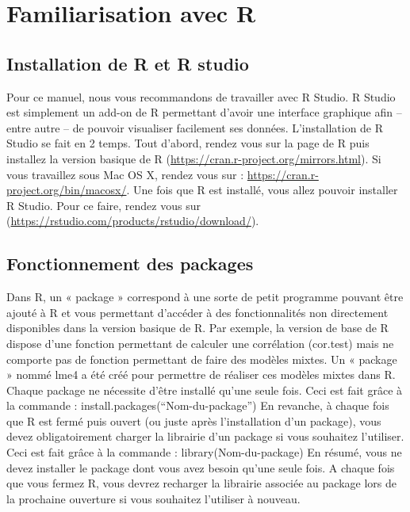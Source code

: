 \documentclass[
]{book}
\begin{document}
\hypertarget{familiarisation-avec-r}{%
\chapter{Familiarisation avec R}\label{familiarisation-avec-r}}

\hypertarget{installation-de-r-et-r-studio}{%
\section{Installation de R et R studio}\label{installation-de-r-et-r-studio}}

Pour ce manuel, nous vous recommandons de travailler avec R Studio. R Studio est simplement un add-on de R permettant d'avoir une interface graphique afin -- entre autre -- de pouvoir visualiser facilement ses données.
L'installation de R Studio se fait en 2 temps. Tout d'abord, rendez vous sur la page de R puis installez la version basique de R (\url{https://cran.r-project.org/mirrors.html}). Si vous travaillez sous Mac OS X, rendez vous sur : \url{https://cran.r-project.org/bin/macosx/}.
Une fois que R est installé, vous allez pouvoir installer R Studio. Pour ce faire, rendez vous sur (\url{https://rstudio.com/products/rstudio/download/}).

\hypertarget{fonctionnement-des-packages}{%
\section{Fonctionnement des packages}\label{fonctionnement-des-packages}}

Dans R, un « package » correspond à une sorte de petit programme pouvant être ajouté à R et vous permettant d'accéder à des fonctionnalités non directement disponibles dans la version basique de R. Par exemple, la version de base de R dispose d'une fonction permettant de calculer une corrélation (cor.test) mais ne comporte pas de fonction permettant de faire des modèles mixtes. Un « package » nommé lme4 a été créé pour permettre de réaliser ces modèles mixtes dans R.
Chaque package ne nécessite d'être installé qu'une seule fois. Ceci est fait grâce à la commande :
install.packages(``Nom-du-package'')
En revanche, à chaque fois que R est fermé puis ouvert (ou juste après l'installation d'un package), vous devez obligatoirement charger la librairie d'un package si vous souhaitez l'utiliser. Ceci est fait grâce à la commande :
library(Nom-du-package)
En résumé, vous ne devez installer le package dont vous avez besoin qu'une seule fois. A chaque fois que vous fermez R, vous devrez recharger la librairie associée au package lors de la prochaine ouverture si vous souhaitez l'utiliser à nouveau.
\end{document}

